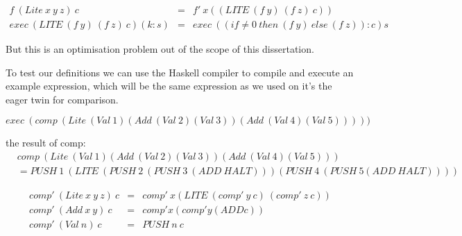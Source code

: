 \documentclass {article}
\begin{document}
\begin{eqnarray*}
	f \ (Lite \ x \ y \ z) \ c &=& f' \ x ((LITE \ (f \ y) \ (f \ z) \ c)) \\
	exec \ (LITE \ (f \ y) \ (f \ z) \ c) (k : s) &=& exec \ ((if \not=0 \ then \ (f \ y) \ else \ (f \ z)) : c) s 
\end{eqnarray*}

But this is an optimisation problem out of the scope of this dissertation.


To test our definitions we can use the Haskell compiler
to compile and execute an example \lite expression,
which will be the same expression as we used
on it's the eager twin for comparison.

	\[ exec \ (comp \ (Lite \ (Val \ 1) (Add \ (Val \ 2) (Val \ 3)) (Add \ (Val \ 4) (Val \ 5))))) \]

the result of comp: 
\begin{align*}	
	&comp \ (Lite \ (Val \ 1) (Add \ (Val \ 2) (Val \ 3)) (Add \ (Val \ 4) (Val \ 5))) \\
	&= PUSH \ 1 \ (LITE \ (PUSH \ 2 \ (PUSH \ 3 \ (ADD \ HALT))) (PUSH \ 4 \ (PUSH \ 5 (ADD \ HALT))))
\end{align*}

\begin{eqnarray}
	comp' \ (Lite \ x \ y \ z) \ c &=& comp' \ x (LITE \ (comp' \ y \ c) \ (comp' \ z \ c)) \\
	comp' \ (Add \ x \ y) \ c     &=&  comp' x (comp' y (ADD c)) \\
	comp' \ (Val \ n) \ c         &=&  PUSH \ n \ c
\end{eqnarray}
\end{document}
